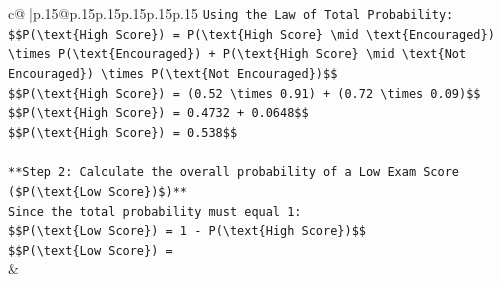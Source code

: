 \documentclass{article}
\begin{document}
{\begin{supertabular}{c@{$\;$}|p{.15\linewidth}@{}p{.15\linewidth}p{.15\linewidth}p{.15\linewidth}p{.15\linewidth}p{.15\linewidth}}
{{{\texttt{Using the Law of Total Probability:} \\
\texttt{\$\$P(\textbackslash{}text\{High Score\}) = P(\textbackslash{}text\{High Score\} \textbackslash{}mid \textbackslash{}text\{Encouraged\}) \textbackslash{}times P(\textbackslash{}text\{Encouraged\}) + P(\textbackslash{}text\{High Score\} \textbackslash{}mid \textbackslash{}text\{Not Encouraged\}) \textbackslash{}times P(\textbackslash{}text\{Not Encouraged\})\$\$} \\
\texttt{\$\$P(\textbackslash{}text\{High Score\}) = (0.52 \textbackslash{}times 0.91) + (0.72 \textbackslash{}times 0.09)\$\$} \\
\texttt{\$\$P(\textbackslash{}text\{High Score\}) = 0.4732 + 0.0648\$\$} \\
\texttt{\$\$P(\textbackslash{}text\{High Score\}) = 0.538\$\$} \\
\\ 
\texttt{**Step 2: Calculate the overall probability of a Low Exam Score (\$P(\textbackslash{}text\{Low Score\})\$)**} \\
\texttt{Since the total probability must equal 1:} \\
\texttt{\$\$P(\textbackslash{}text\{Low Score\}) = 1 {-} P(\textbackslash{}text\{High Score\})\$\$} \\
\texttt{\$\$P(\textbackslash{}text\{Low Score\}) =} \\
            }
        }
    }
    & \\ \\


\end{supertabular}}
\end{document}
